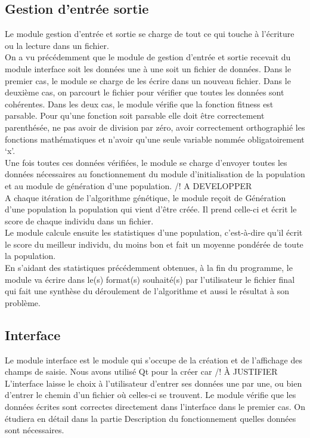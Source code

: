 \documentclass[a4paper,11pt]{article}
\begin{document}
		\subsection{Gestion d'entrée sortie}
			Le module gestion d’entrée et sortie se charge de tout ce qui touche à l’écriture ou la lecture dans un fichier.\\
			On a vu précédemment que le module de gestion d’entrée et sortie recevait du module interface soit les données une à une soit un fichier de données.
			Dans le premier cas, le module se charge de les écrire dans un nouveau fichier.
			Dans le deuxième cas, on parcourt le fichier pour vérifier que toutes les données sont cohérentes. Dans les deux cas, le module vérifie que la fonction fitness est parsable.
			Pour qu’une fonction soit parsable elle doit être correctement parenthésée, ne pas avoir de division par zéro, avoir correctement orthographié les fonctions mathématiques et n’avoir qu’une seule variable nommée obligatoirement ‘x’.\\
			Une fois toutes ces données vérifiées, le module se charge d’envoyer toutes les données nécessaires au fonctionnement du module d’initialisation de la population et au module de génération d’une population. /! A DEVELOPPER\\
			A chaque itération de l’algorithme génétique, le module reçoit de Génération d’une population la population qui vient d’être créée.
			Il prend celle-ci et écrit le score de chaque individu dans un fichier.\\
			Le module calcule ensuite les statistiques d’une population, c’est-à-dire qu’il écrit le score du meilleur individu, du moins bon et fait un moyenne pondérée de toute la population.\\
			En s’aidant des statistiques précédemment obtenues, à la fin du programme, le module va écrire dans le(s) format(s) souhaité(s) par l’utilisateur le fichier final qui fait une synthèse du déroulement de l’algorithme et aussi le résultat à son problème.
		
		\subsection{Interface}
			Le module interface est le module qui s’occupe de la création et de l’affichage des champs de saisie. Nous avons utilisé Qt pour la créer car /! À JUSTIFIER\\	
			L’interface laisse le choix à l’utilisateur d’entrer ses données une par une, ou bien d’entrer le chemin  d’un fichier où celles-ci se trouvent.
			Le module vérifie que les données écrites sont correctes directement dans l’interface dans le premier cas.
			On étudiera en détail dans la partie Description du fonctionnement quelles données sont nécessaires.\\
\end{document}
